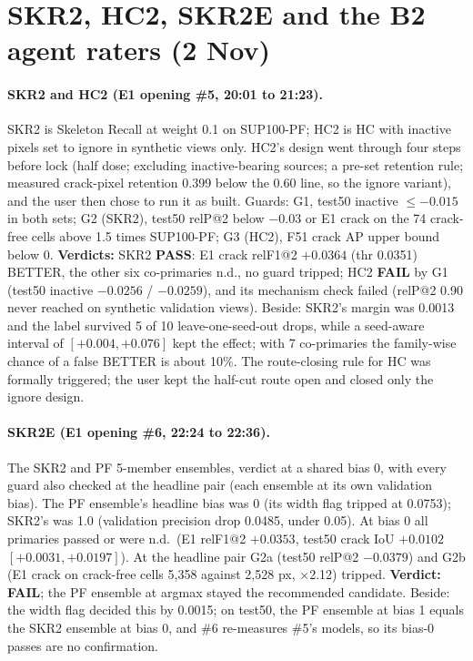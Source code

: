 \section{SKR2, HC2, SKR2E and the B2 agent raters (2 Nov)}\label{sec:midnov-skr2}

\paragraph{SKR2 and HC2 (E1 opening \#5, 20:01 to 21:23).} SKR2 is Skeleton Recall at weight 0.1 on SUP100-PF; HC2 is HC with
inactive pixels set to ignore in synthetic views only. HC2's design went through four steps before lock (half dose; excluding
inactive-bearing sources; a pre-set retention rule; measured crack-pixel retention 0.399 below the 0.60 line, so the ignore
variant), and the user then chose to run it as built. Guards: G1, test50 inactive $\leq -0.015$ in both sets; G2 (SKR2), test50 relP@2 below $-0.03$ or E1 crack on the 74
crack-free cells above 1.5 times SUP100-PF; G3 (HC2), F51 crack AP upper bound below 0. \textbf{Verdicts:} SKR2 \textbf{PASS}: E1
crack relF1@2 $+0.0364$ (thr 0.0351) BETTER, the other six co-primaries n.d., no guard tripped; HC2 \textbf{FAIL} by G1 (test50
inactive $-0.0256$ / $-0.0259$), and its mechanism check failed (relP@2 0.90 never reached on synthetic validation views). Beside:
SKR2's margin was 0.0013 and the label survived 5 of 10 leave-one-seed-out drops, while a seed-aware interval of $[+0.004, +0.076]$
kept the effect; with 7 co-primaries the family-wise chance of a false BETTER is about 10\%. The route-closing rule for HC was
formally triggered; the user kept the half-cut route open and closed only the ignore design.

\paragraph{SKR2E (E1 opening \#6, 22:24 to 22:36).} The SKR2 and PF 5-member ensembles, verdict at a shared bias 0, with every guard
also checked at the headline pair (each ensemble at its own validation bias). The PF ensemble's headline bias was 0 (its width flag
tripped at 0.0753); SKR2's was 1.0 (validation precision drop 0.0485, under 0.05). At bias 0 all primaries passed or were n.d.\ (E1
relF1@2 $+0.0353$, test50 crack IoU $+0.0102$ $[+0.0031, +0.0197]$). At the headline pair G2a (test50 relP@2 $-0.0379$) and G2b (E1
crack on crack-free cells 5,358 against 2,528 px, $\times$2.12) tripped. \textbf{Verdict: FAIL}; the PF ensemble at argmax stayed the
recommended candidate. Beside: the width flag decided this by 0.0015; on test50, the PF ensemble at bias 1 equals the SKR2 ensemble
at bias 0, and \#6 re-measures \#5's models, so its bias-0 passes are no confirmation.

